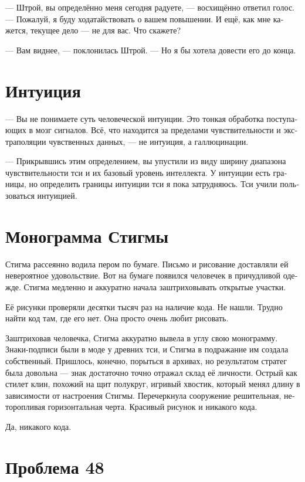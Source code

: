 \documentclass[a4paper,12pt,fleqn]{book}\usepackage{polyglossia}\setdefaultlanguage[babelshorthands=true]{russian}\setotherlanguage{english}\defaultfontfeatures{Ligatures=TeX,Mapping=tex-text}\usepackage{xcolor}\newcommand{\ml}[3]{#2}
\begin{document}
{--- Штрой, вы определённо меня сегодня радуете, --- восхищённо ответил голос.
--- Пожалуй, я буду ходатайствовать о вашем повышении.
И ещё, как мне кажется, текущее дело --- не для вас.
Что скажете?

--- Вам виднее, --- поклонилась Штрой.
--- Но я бы хотела довести его до конца.

\section{Интуиция}

--- Вы не понимаете суть человеческой интуиции.
Это тонкая обработка поступающих в мозг сигналов.
Всё, что находится за пределами чувствительности и экстраполяции чувственных данных, --- не интуиция, а галлюцинации.

--- Прикрывшись этим определением, вы упустили из виду ширину диапазона чувствительности тси и их базовый уровень интеллекта.
У интуиции есть границы, но определить границы интуиции тси я пока затрудняюсь.
Тси учили пользоваться интуицией.

\section{Монограмма Стигмы}

Стигма рассеянно водила пером по бумаге.
Письмо и рисование доставляли ей невероятное удовольствие.
Вот на бумаге появился человечек в причудливой одежде.
Стигма медленно и аккуратно начала заштриховывать открытые участки.

Её рисунки проверяли десятки тысяч раз на наличие кода.
Не нашли.
Трудно найти код там, где его нет.
Она просто очень любит рисовать.

Заштриховав человечка, Стигма аккуратно вывела в углу свою монограмму.
Знаки-подписи были в моде у древних тси, и Стигма в подражание им создала собственный.
Пришлось, конечно, порыться в архивах, но результатом стратег была довольна --- знак достаточно точно отражал склад её личности.
Острый как стилет клин, похожий на щит полукруг, игривый хвостик, который менял длину в зависимости от настроения Стигмы.
Перечеркнула сооружение решительная, неторопливая горизонтальная черта.
Красивый рисунок и никакого кода.

Да, никакого кода.

\section{Проблема 48}

}
\end{document}
